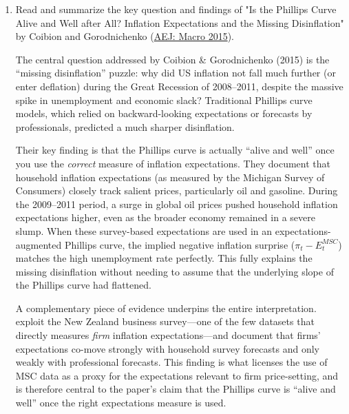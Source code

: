 \documentclass[dvipsnames,11pt]{article}
\begin{document}
        \begin{enumerate}[resume]
            \item Read and summarize the key question and findings of "Is the Phillips Curve Alive and Well after All? Inflation Expectations and the Missing Disinflation" by Coibion and Gorodnichenko (\href{https://www.aeaweb.org/articles?id=10.1257/mac.20130306}{AEJ: Macro 2015}). 

                \begin{solution}

                    The central question addressed by Coibion \& Gorodnichenko (2015) is the ``missing disinflation'' puzzle: why did US inflation not fall much further (or enter deflation) during the Great Recession of 2008--2011, despite the massive spike in unemployment and economic slack? Traditional Phillips curve models, which relied on backward-looking expectations or forecasts by professionals, predicted a much sharper disinflation.

                    Their key finding is that the Phillips curve is actually ``alive and well'' once you use the \emph{correct} measure of inflation expectations. They document that household inflation expectations (as measured by the Michigan Survey of Consumers) closely track salient prices, particularly oil and gasoline. During the 2009--2011 period, a surge in global oil prices pushed household inflation expectations higher, even as the broader economy remained in a severe slump. When these survey-based expectations are used in an expectations-augmented Phillips curve, the implied negative inflation surprise ($\pi_t - E^{MSC}_t$) matches the high unemployment rate perfectly. This fully explains the missing disinflation without needing to assume that the underlying slope of the Phillips curve had flattened.

                    A complementary piece of evidence underpins the entire interpretation. \textcite{coibion2015phillips} exploit the New Zealand business survey---one of the few datasets that directly measures \emph{firm} inflation expectations---and document that firms' expectations co-move strongly with household survey forecasts and only weakly with professional forecasts. This finding is what licenses the use of MSC data as a proxy for the expectations relevant to firm price-setting, and is therefore central to the paper's claim that the Phillips curve is ``alive and well'' once the right expectations measure is used.
                    
                \end{solution}
        \end{enumerate}
\end{document}
